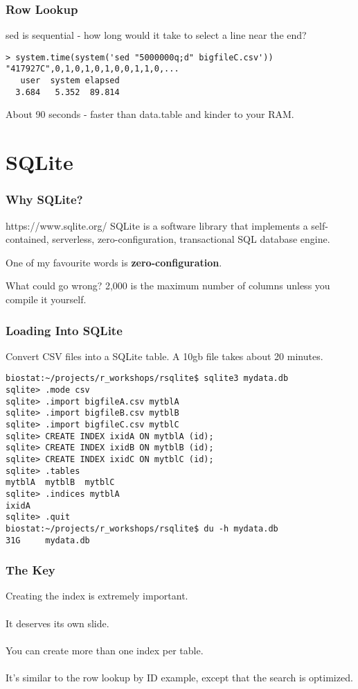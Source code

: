 \documentclass{beamer}
\begin{document}
\begin{frame}[fragile=singleslide]
\frametitle{Row Lookup}
sed is sequential - how long would it take to select a line near the end?
\begin{verbatim}
> system.time(system('sed "5000000q;d" bigfileC.csv'))                     
"417927C",0,1,0,1,0,1,0,0,1,1,0,...
   user  system elapsed 
  3.684   5.352  89.814
\end{verbatim}
About 90 seconds - faster than data.table and kinder to your RAM.
\end{frame}

\section{SQLite}

\begin{frame}
\frametitle{Why SQLite?}
    \begin{block}{https://www.sqlite.org/}
    SQLite is a software library that implements a self-contained, serverless, zero-configuration, transactional SQL database engine.
    \end{block}

One of my favourite words is \textbf{zero-configuration}.

    \begin{alertblock}{What could go wrong?}
    2,000 is the maximum number of columns unless you compile it yourself.
    \end{alertblock}
\end{frame}

\begin{frame}[fragile=singleslide]
\frametitle{Loading Into SQLite}
Convert CSV files into a SQLite table.  A 10gb file takes about 20 minutes.
\begin{verbatim}
biostat:~/projects/r_workshops/rsqlite$ sqlite3 mydata.db
sqlite> .mode csv
sqlite> .import bigfileA.csv mytblA
sqlite> .import bigfileB.csv mytblB
sqlite> .import bigfileC.csv mytblC
sqlite> CREATE INDEX ixidA ON mytblA (id);
sqlite> CREATE INDEX ixidB ON mytblB (id);
sqlite> CREATE INDEX ixidC ON mytblC (id);
sqlite> .tables
mytblA  mytblB  mytblC
sqlite> .indices mytblA
ixidA
sqlite> .quit
biostat:~/projects/r_workshops/rsqlite$ du -h mydata.db 
31G     mydata.db
\end{verbatim}
\end{frame}

\begin{frame}
\frametitle{The Key}
Creating the index is extremely important.\\~\\
It deserves its own slide.\\~\\
You can create more than one index per table.\\~\\
It's similar to the row lookup by ID example, except that the search is optimized.
\end{frame}
\end{document}
